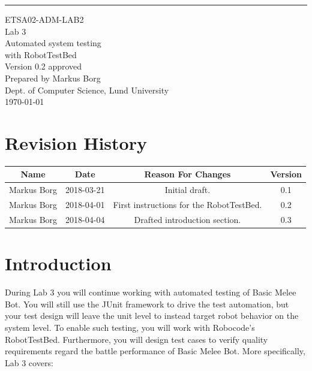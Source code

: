 \documentclass{scrreprt}
\date{}
\def\myversion{0.2 }
\begin{document}
\begin{flushright}
    \rule{16cm}{5pt}\vskip1cm
    \begin{bfseries}
    	\LARGE{ETSA02-ADM-LAB2}\\
    	\vspace{1.5cm}
        \Huge{Lab 3}\\
        \vspace{0.5cm}
        Automated system testing\\
        \vspace{0.5cm}
        with RobotTestBed\\
        \vspace{1.5cm}
        \LARGE{Version \myversion approved}\\
        \vspace{1.5cm}
        Prepared by Markus Borg\\
        Dept. of Computer Science, Lund University\\
        \vspace{1.5cm}
        \today\\
    \end{bfseries}
\end{flushright}


\chapter*{Revision History}

\begin{center}
    \begin{tabular}{|c|c|c|c|}
        \hline
	    Name & Date & Reason For Changes & Version\\
        \hline
	    Markus Borg & 2018-03-21 & Initial draft. & 0.1\\
        \hline
        Markus Borg & 2018-04-01 & First instructions for the RobotTestBed. & 0.2\\
        \hline
        Markus Borg & 2018-04-04 & Drafted introduction section. & 0.3\\
        \hline
    \end{tabular}
\end{center}

\chapter{Introduction}
During Lab 3 you will continue working with automated testing of Basic Melee Bot. You will still use the JUnit framework to drive the test automation, but your test design will leave the unit level to instead target robot behavior on the system level. To enable such testing, you will work with Robocode's RobotTestBed. Furthermore, you will design test cases to verify quality requirements regard the battle performance of Basic Melee Bot. More specifically, Lab 3 covers:
\end{document}
